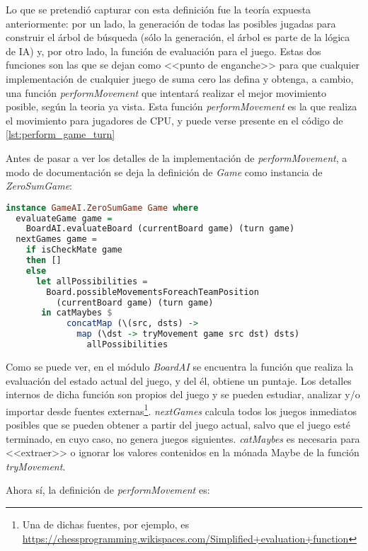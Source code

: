 \documentclass{llncs}
\begin{document}
Lo que se pretendió capturar con esta definición fue la teoría expuesta anteriormente: por un lado, la generación de todas las posibles jugadas para construir el árbol de búsqueda (sólo la generación, el árbol es parte de la lógica de IA) y, por otro lado, la función de evaluación para el juego. Estas dos funciones son las que se dejan como <<punto de enganche>> para que cualquier implementación de cualquier juego de suma cero las defina y obtenga, a cambio, una función \textit{performMovement} que intentará realizar el mejor movimiento posible, según la teoria ya vista. Esta función \textit{performMovement} es la que realiza el movimiento para jugadores de CPU, y puede verse presente en el código de \ref{lst:perform_game_turn}

Antes de pasar a ver los detalles de la implementación de \textit{performMovement}, a modo de documentación se deja la definición de \textit{Game} como instancia de \textit{ZeroSumGame}:


\begin{lstlisting}[frame=single, language=haskell, captionpos=b, caption=Definición de Game como instancia de ZeroSumGame, label={lst:zero_sum_game_instance}]
instance GameAI.ZeroSumGame Game where
  evaluateGame game =
    BoardAI.evaluateBoard (currentBoard game) (turn game)
  nextGames game =
    if isCheckMate game
    then []
    else
      let allPossibilities =
        Board.possibleMovementsForeachTeamPosition
          (currentBoard game) (turn game)
       in catMaybes $
            concatMap (\(src, dsts) ->
              map (\dst -> tryMovement game src dst) dsts)
                allPossibilities
\end{lstlisting}

Como se puede ver, en el módulo \textit{BoardAI} se encuentra la función que realiza la evaluación del estado actual del juego, y del él, obtiene un puntaje. Los detalles internos de dicha función son propios del juego y se pueden estudiar, analizar y/o importar desde fuentes externas\footnote{Una de dichas fuentes, por ejemplo, es \url{https://chessprogramming.wikispaces.com/Simplified+evaluation+function}}. \textit{nextGames} calcula todos los juegos inmediatos posibles que se pueden obtener a partir del juego actual, salvo que el juego esté terminado, en cuyo caso, no genera juegos siguientes. \textit{catMaybes} es necesaria para <<extraer>> o ignorar los valores contenidos en la mónada Maybe de la función \textit{tryMovement}.

Ahora sí, la definición de \textit{performMovement} es:
\end{document}
